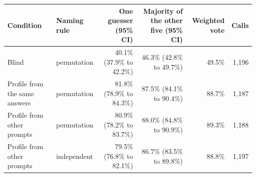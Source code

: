 \begin{tabular}{llrrrr}
\toprule
Condition & Naming rule & One guesser (95\% CI) & Majority of the other five (95\% CI) & Weighted vote & Calls \\
\midrule
Blind & permutation & 40.1\% (37.9\% to 42.2\%) & 46.3\% (42.8\% to 49.7\%) & 49.5\% & 1{,}196 \\
Profile from the same answers & permutation & 81.8\% (78.9\% to 84.3\%) & 87.5\% (84.1\% to 90.4\%) & 88.7\% & 1{,}187 \\
Profile from other prompts & permutation & 80.9\% (78.2\% to 83.7\%) & 88.0\% (84.8\% to 90.9\%) & 89.3\% & 1{,}188 \\
Profile from other prompts & independent & 79.5\% (76.8\% to 82.1\%) & 86.7\% (83.5\% to 89.8\%) & 88.8\% & 1{,}197 \\
\bottomrule
\end{tabular}
